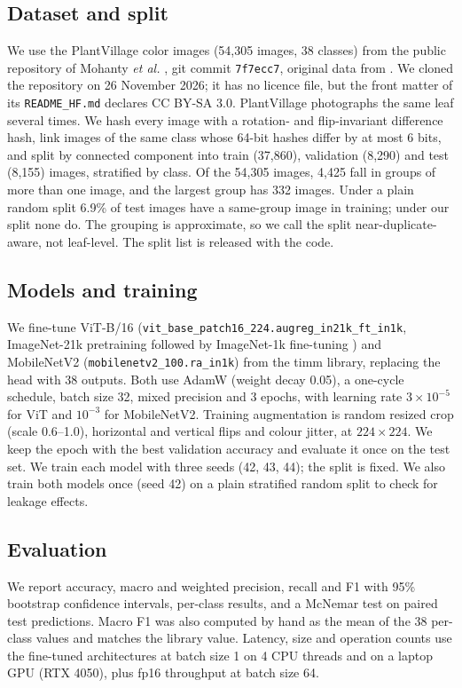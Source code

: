 \documentclass[conference]{IEEEtran}
\begin{document}
\subsection{Dataset and split}
We use the PlantVillage color images (54,305 images, 38 classes) from the public repository of Mohanty \emph{et al.} \cite{mohanty2016}, git commit \texttt{7f7ecc7}, original data from \cite{hughes2015plantvillage}. We cloned the repository on 26 November 2026; it has no licence file, but the front matter of its \texttt{README\_HF.md} declares CC BY-SA 3.0. PlantVillage photographs the same leaf several times. We hash every image with a rotation- and flip-invariant difference hash, link images of the same class whose 64-bit hashes differ by at most 6 bits, and split by connected component into train (37,860), validation (8,290) and test (8,155) images, stratified by class. Of the 54,305 images, 4,425 fall in groups of more than one image, and the largest group has 332 images. Under a plain random split 6.9\% of test images have a same-group image in training; under our split none do. The grouping is approximate, so we call the split near-duplicate-aware, not leaf-level. The split list is released with the code.

\subsection{Models and training}
We fine-tune ViT-B/16 (\texttt{vit\_\allowbreak{}base\_\allowbreak{}patch16\_\allowbreak{}224.augreg\_\allowbreak{}in21k\_\allowbreak{}ft\_\allowbreak{}in1k}, ImageNet-21k pretraining followed by ImageNet-1k fine-tuning \cite{steiner2022augreg}) and MobileNetV2 (\texttt{mobilenetv2\_\allowbreak{}100.ra\_\allowbreak{}in1k}) from the timm library, replacing the head with 38 outputs. Both use AdamW (weight decay 0.05), a one-cycle schedule, batch size 32, mixed precision and 3 epochs, with learning rate $3\times10^{-5}$ for ViT and $10^{-3}$ for MobileNetV2. Training augmentation is random resized crop (scale 0.6--1.0), horizontal and vertical flips and colour jitter, at $224\times224$. We keep the epoch with the best validation accuracy and evaluate it once on the test set. We train each model with three seeds (42, 43, 44); the split is fixed. We also train both models once (seed 42) on a plain stratified random split to check for leakage effects.

\subsection{Evaluation}
We report accuracy, macro and weighted precision, recall and F1 with 95\% bootstrap confidence intervals, per-class results, and a McNemar test on paired test predictions. Macro F1 was also computed by hand as the mean of the 38 per-class values and matches the library value. Latency, size and operation counts use the fine-tuned architectures at batch size 1 on 4 CPU threads and on a laptop GPU (RTX 4050), plus fp16 throughput at batch size 64.
\end{document}
